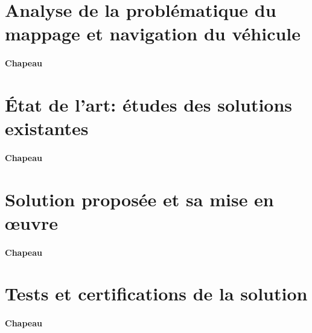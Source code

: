 \section{Analyse de la problématique du mappage et navigation du véhicule} \label{sec:Problematiquemappage}

\paragraph{Chapeau}


\section{État de l’art: études des solutions existantes} \label{sec:etatDeLart4}

\paragraph{Chapeau}


\section{Solution proposée et sa mise en œuvre} \label{sec:solution4}

\paragraph{Chapeau}


\section{Tests et certifications de la solution} \label{sec:test4}

\paragraph{Chapeau}
